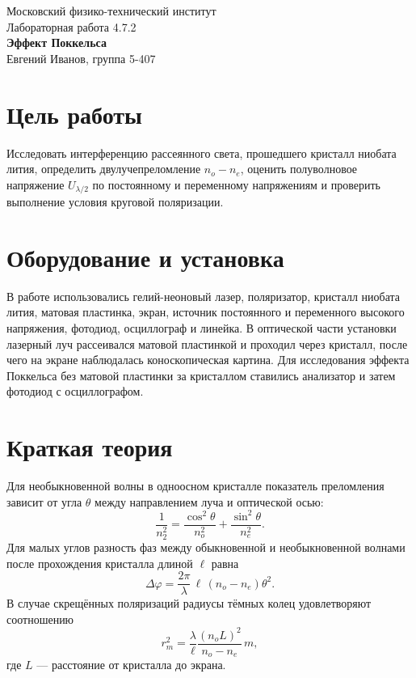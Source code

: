 \documentclass[a4paper,12pt]{article}
\begin{document}
\begin{center}
{\large Московский физико-технический институт}\\[0.5em]
{\large Лабораторная работа 4.7.2}\\[0.5em]
{\Large \textbf{Эффект Поккельса}}\\[1em]
Евгений Иванов, группа 5-407
\end{center}

\section*{Цель работы}
Исследовать интерференцию рассеянного света, прошедшего кристалл ниобата лития, определить двулучепреломление $n_o-n_e$, оценить полуволновое напряжение $U_{\lambda/2}$ по постоянному и переменному напряжениям и проверить выполнение условия круговой поляризации.

\section*{Оборудование и установка}
В работе использовались гелий-неоновый лазер, поляризатор, кристалл ниобата лития, матовая пластинка, экран, источник постоянного и переменного высокого напряжения, фотодиод, осциллограф и линейка. В оптической части установки лазерный луч рассеивался матовой пластинкой и проходил через кристалл, после чего на экране наблюдалась коноскопическая картина. Для исследования эффекта Поккельса без матовой пластинки за кристаллом ставились анализатор и затем фотодиод с осциллографом.

\section*{Краткая теория}
Для необыкновенной волны в одноосном кристалле показатель преломления зависит от угла $\theta$ между направлением луча и оптической осью:
\begin{equation}
\frac{1}{n_2^2}=\frac{\cos^2\theta}{n_o^2}+\frac{\sin^2\theta}{n_e^2}.
\end{equation}
Для малых углов разность фаз между обыкновенной и необыкновенной волнами после прохождения кристалла длиной $\ell$ равна
\begin{equation}
\Delta\varphi=\frac{2\pi}{\lambda}\,\ell\,(n_o-n_e)\theta^2.
\end{equation}
В случае скрещённых поляризаций радиусы тёмных колец удовлетворяют соотношению
\begin{equation}
r_m^2=\frac{\lambda}{\ell}\frac{(n_oL)^2}{n_o-n_e}\,m,
\label{eq:rings}
\end{equation}
где $L$ --- расстояние от кристалла до экрана.
\end{document}
